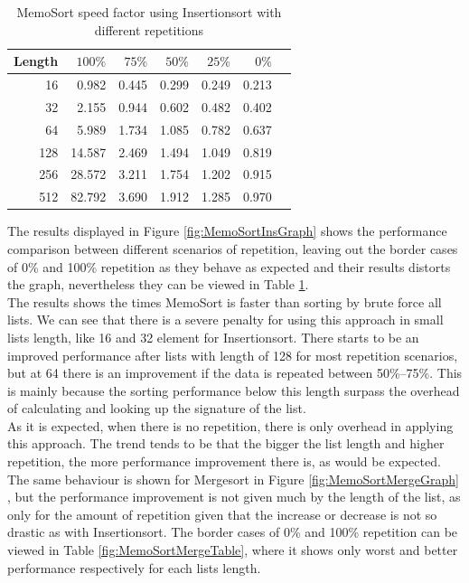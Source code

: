 \documentclass[a4paper,12pt]{article}
\begin{document}
\begin{table}[H]
\centering
\begin{tabular}{|r|r|r|r|r|r|r|}   \hline
	{Length}  & {$100\%$} & {$75\%$} & {$50\%$} & {$25\%$} & {$0\%$} \\  \hline
	16  &0.982& 0.445 & 0.299  & 0.249 &  0.213 \\ 
	32 & 2.155 & 0.944 & 0.602 &  0.482 & 0.402 \\ 
	64 &  5.989 & 1.734 & 1.085 & 0.782 & 0.637 \\ 
	128 &14.587 & 2.469 & 1.494 & 1.049  & 0.819 \\ 
	256 & 28.572& 3.211 & 1.754 & 1.202 & 0.915 \\ 
	512 & 82.792& 3.690 & 1.912 & 1.285 & 0.970 \\  \hline
\end{tabular}
\caption{MemoSort speed factor using Insertionsort with different repetitions}
\label{fig:MemoSortInsTable}
\end{table}

The results displayed in Figure \ref{fig:MemoSortInsGraph} shows the performance comparison between different scenarios of repetition, leaving out the border cases of 0\% and 100\% repetition as they behave as expected and their results distorts the graph, nevertheless they can be viewed in Table \ref{fig:MemoSortInsTable}. \\

The results shows the times MemoSort is faster than sorting by brute force all lists. We can see that there is a severe penalty for using this approach in small lists length, like 16 and 32 element for Insertionsort. There starts to be an improved performance after lists with length of 128 for most repetition scenarios, but at 64 there is an improvement if the data is repeated between 50\%--75\%. This is  mainly because the sorting performance below this length surpass the overhead of calculating and looking up the signature of the list. \\
As it is expected, when there is no repetition, there is only overhead in applying this approach. The trend tends to be that the bigger the list length and higher repetition, the more performance improvement there is, as would be expected.\\

The same behaviour is shown for Mergesort in Figure  \ref{fig:MemoSortMergeGraph} , but the performance improvement is not given much by the length of the list, as only for the amount of repetition given that the increase or decrease is not so drastic as with Insertionsort. The border cases of 0\% and 100\% repetition can be viewed in Table \ref{fig:MemoSortMergeTable}, where it shows only worst and better performance respectively for each lists length.
\end{document}
